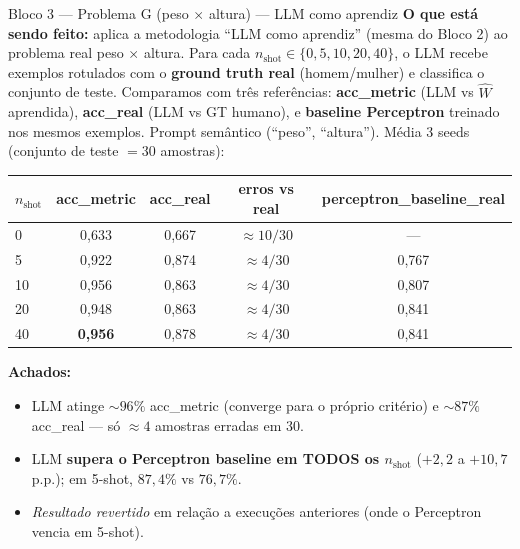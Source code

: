 \documentclass[aspectratio=169,10pt]{beamer}
\begin{document}
\begin{frame}{Bloco 3 --- Problema G (peso $\times$ altura) --- LLM como aprendiz}
  \scriptsize
  \textbf{O que est\'a sendo feito:} aplica a metodologia ``LLM como aprendiz'' (mesma do Bloco 2) ao problema real peso $\times$ altura. Para cada $n_{\text{shot}} \in \{0, 5, 10, 20, 40\}$, o LLM recebe exemplos rotulados com o \textbf{ground truth real} (homem/mulher) e classifica o conjunto de teste. Comparamos com tr\^es refer\^encias: \textbf{acc\_metric} (LLM vs $\hat W$ aprendida), \textbf{acc\_real} (LLM vs GT humano), e \textbf{baseline Perceptron} treinado nos mesmos exemplos. Prompt sem\^antico (``peso'', ``altura'').
  \medskip
  M\'edia 3 seeds (conjunto de teste $= 30$ amostras):
  \begin{center}
  \begin{tabular}{lcccc}
    \toprule
    $n_{\text{shot}}$ & acc\_metric & acc\_real & \textbf{erros vs real} & perceptron\_baseline\_real \\
    \midrule
    0  & 0{,}633 & 0{,}667 & $\approx 10/30$ & --- \\
    5  & 0{,}922 & 0{,}874 & $\approx 4/30$ & 0{,}767 \\
    10 & 0{,}956 & 0{,}863 & $\approx 4/30$ & 0{,}807 \\
    20 & 0{,}948 & 0{,}863 & $\approx 4/30$ & 0{,}841 \\
    40 & \textbf{0{,}956} & 0{,}878 & $\approx 4/30$ & 0{,}841 \\
    \bottomrule
  \end{tabular}
  \end{center}
  \textbf{Achados:}
  \begin{itemize}
    \item LLM atinge $\sim 96\%$ acc\_metric (converge para o pr\'oprio crit\'erio) e $\sim 87\%$ acc\_real --- s\'o $\approx 4$ amostras erradas em 30.
    \item LLM \textbf{supera o Perceptron baseline em TODOS os $n_{\text{shot}}$} ($+2{,}2$ a $+10{,}7$ p.p.); em 5-shot, $87{,}4\%$ vs $76{,}7\%$.
    \item \emph{Resultado revertido} em rela\c{c}\~ao a execu\c{c}\~oes anteriores (onde o Perceptron vencia em 5-shot).
  \end{itemize}
\end{frame}
\end{document}
